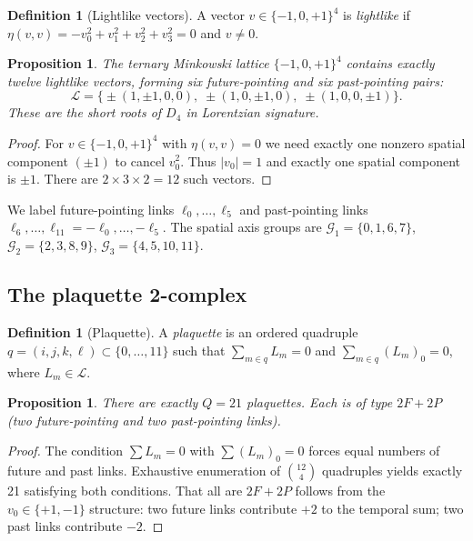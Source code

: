 \documentclass[12pt,a4paper]{article}
\theoremstyle{plain}
\newtheorem{proposition}[theorem]{Proposition}
\theoremstyle{definition}
\newtheorem{definition}[theorem]{Definition}
\newcommand{\Lc}{\mathcal{L}}
\begin{document}
\begin{definition}[Lightlike vectors]
  A vector $v \in \{-1,0,+1\}^4$ is \emph{lightlike} if
  $\eta(v,v) = -v_0^2 + v_1^2 + v_2^2 + v_3^2 = 0$
  and $v \neq 0$.
\end{definition}

\begin{proposition}
  The ternary Minkowski lattice $\{-1,0,+1\}^4$ contains exactly
  twelve lightlike vectors, forming six future-pointing and six
  past-pointing pairs:
  \begin{equation}
    \Lc = \bigl\{\pm(1,\pm 1, 0, 0),\;
                  \pm(1, 0,\pm 1, 0),\;
                  \pm(1, 0, 0,\pm 1)\bigr\}.
  \end{equation}
  These are the short roots of $D_4$ in Lorentzian signature.
\end{proposition}

\begin{proof}
  For $v \in \{-1,0,+1\}^4$ with $\eta(v,v)=0$ we need exactly one
  nonzero spatial component $(\pm 1)$ to cancel $v_0^2$.  Thus $|v_0|=1$
  and exactly one spatial component is $\pm 1$.  There are $2 \times 3
  \times 2 = 12$ such vectors.
\end{proof}

We label future-pointing links $\ell_0,\ldots,\ell_5$ and past-pointing
links $\ell_6,\ldots,\ell_{11} = -\ell_0,\ldots,-\ell_5$.  The spatial
axis groups are
$\mathcal{G}_1 = \{0,1,6,7\}$,
$\mathcal{G}_2 = \{2,3,8,9\}$,
$\mathcal{G}_3 = \{4,5,10,11\}$.

\subsection{The plaquette 2-complex}

\begin{definition}[Plaquette]
  A \emph{plaquette} is an ordered quadruple $q = (i,j,k,\ell) \subset \{0,\ldots,11\}$
  such that $\sum_{m \in q} L_m = 0$ and $\sum_{m \in q} (L_m)_0 = 0$,
  where $L_m \in \Lc$.
\end{definition}

\begin{proposition}
\label{prop:plaquettes}
  There are exactly $Q = 21$ plaquettes.  Each is of type $2F+2P$
  (two future-pointing and two past-pointing links).
\end{proposition}

\begin{proof}
  The condition $\sum L_m = 0$ with $\sum (L_m)_0 = 0$ forces equal
  numbers of future and past links.  Exhaustive enumeration of
  $\binom{12}{4}$ quadruples yields exactly 21 satisfying both conditions.
  That all are $2F+2P$ follows from the $v_0 \in \{+1,-1\}$ structure:
  two future links contribute $+2$ to the temporal sum; two past links
  contribute $-2$.
\end{proof}
\end{document}
